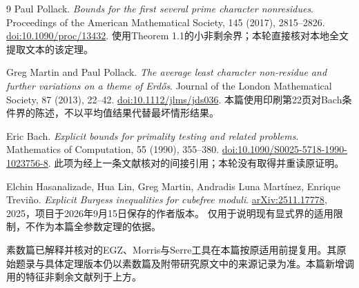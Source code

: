 \documentclass[11pt,a4paper,oneside,openany]{book}
\theoremstyle{definition}\newtheorem{example}[theorem]{例}\newtheorem{conjecture}[theorem]{猜想}
\numberwithin{equation}{chapter}\setcounter{tocdepth}{1}
\begin{document}
\backmatter
\begin{thebibliography}{9}
Paul Pollack.
\emph{Bounds for the first several prime character nonresidues}.
Proceedings of the American Mathematical Society, 145 (2017), 2815--2826.
\href{https://doi.org/10.1090/proc/13432}{doi:10.1090/proc/13432}.
使用Theorem 1.1的小非剩余界；本轮直接核对本地全文提取文本的该定理。

Greg Martin and Paul Pollack.
\emph{The average least character non-residue and further variations on a theme of Erdős}.
Journal of the London Mathematical Society, 87 (2013), 22--42.
\href{https://doi.org/10.1112/jlms/jds036}{doi:10.1112/jlms/jds036}.
本篇使用印刷第22页对Bach条件界的陈述，不以平均值结果代替最坏情形结果。

Eric Bach.
\emph{Explicit bounds for primality testing and related problems}.
Mathematics of Computation, 55 (1990), 355--380.
\href{https://doi.org/10.1090/S0025-5718-1990-1023756-8}{doi:10.1090/S0025-5718-1990-1023756-8}.
此项为经上一条文献核对的间接引用；本轮没有取得并重读原证明。

Elchin Hasanalizade, Hua Lin, Greg Martin, Andradis Luna Martínez, Enrique Treviño.
\emph{Explicit Burgess inequalities for cubefree moduli}.
\href{https://arxiv.org/abs/2511.17778}{arXiv:2511.17778}, 2025，项目于2026年9月15日保存的作者版本。
仅用于说明现有显式界的适用限制，不作为本篇全参数定理的依据。
\end{thebibliography}

素数篇已解释并核对的EGZ、Morris与Serre工具在本篇按原适用前提复用。其原始题录与具体定理版本仍以素数篇及附带研究原文中的来源记录为准。本篇新增调用的特征非剩余文献列于上方。
\end{document}
